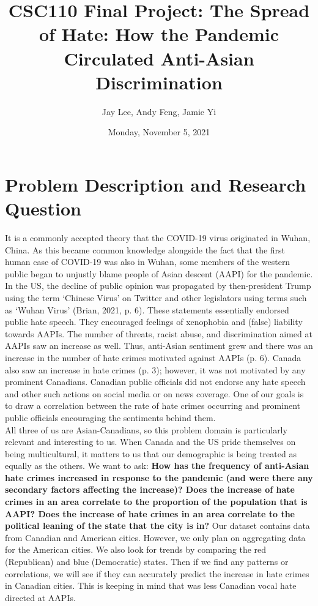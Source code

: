 \documentclass[fontsize=11pt]{article}
\title{CSC110 Final Project: The Spread of Hate: How the Pandemic Circulated Anti-Asian Discrimination}
\author{Jay Lee, Andy Feng, Jamie Yi}
\date{Monday, November 5, 2021}
\begin{document}
\maketitle

\section*{Problem Description and Research Question}

    \quad It is a commonly accepted theory that the COVID-19 virus originated in Wuhan, China. As this became common knowledge alongside the fact that the first human case of COVID-19 was also in Wuhan, some members of the western public began to unjustly blame people of Asian descent (AAPI) for the pandemic. In the US, the decline of public opinion was propagated by then-president Trump using the term ‘Chinese Virus’ on Twitter and other legislators using terms such as ‘Wuhan Virus’ (Brian, 2021, p. 6). These statements essentially endorsed public hate speech. They encouraged feelings of xenophobia and (false) liability towards AAPIs. The number of threats, racist abuse, and discrimination aimed at AAPIs saw an increase as well. Thus, anti-Asian sentiment grew and there was an increase in the number of hate crimes motivated against AAPIs (p. 6). Canada also saw an increase in hate crimes (p. 3); however, it was not motivated by any prominent Canadians. Canadian public officials did not endorse any hate speech and other such actions on social media or on news coverage. One of our goals is to draw a correlation between the rate of hate crimes occurring and prominent public officials encouraging the sentiments behind them.\\

    All three of us are Asian-Canadians, so this problem domain is particularly relevant and interesting to us. When Canada and the US pride themselves on being multicultural, it matters to us that our demographic is being treated as equally as the others. We want to ask: \textbf{How has the frequency of anti-Asian hate crimes increased in response to the pandemic (and were there any secondary factors affecting the increase)? Does the increase of hate crimes in an area correlate to the proportion of the population that is AAPI? Does the increase of hate crimes in an area correlate to the political leaning of the state that the city is in?} Our dataset contains data from Canadian and American cities. However, we only plan on aggregating data for the American cities. We also look for trends by comparing the red (Republican) and blue (Democratic) states. Then if we find any patterns or correlations, we will see if they can accurately predict the increase in hate crimes in Canadian cities. This is keeping in mind that was less Canadian vocal hate directed at AAPIs.
\end{document}
